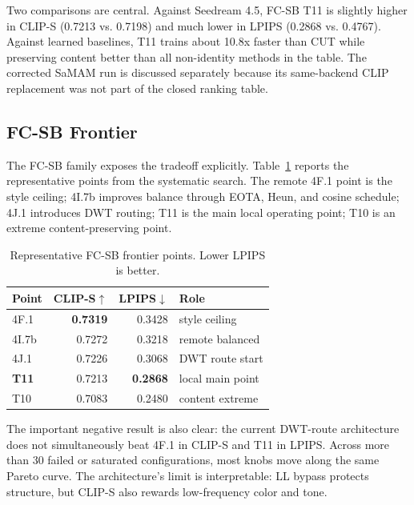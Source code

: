 \documentclass[letterpaper]{article}
\begin{document}
Two comparisons are central. Against Seedream 4.5, FC-SB T11 is slightly higher in CLIP-S (0.7213 vs. 0.7198) and much lower in LPIPS (0.2868 vs. 0.4767). Against learned baselines, T11 trains about 10.8x faster than CUT while preserving content better than all non-identity methods in the table. The corrected SaMAM run is discussed separately because its same-backend CLIP replacement was not part of the closed ranking table.

\subsection{FC-SB Frontier}
The FC-SB family exposes the tradeoff explicitly. Table~\ref{tab:fcsb_frontier} reports the representative points from the systematic search. The remote 4F.1 point is the style ceiling; 4I.7b improves balance through EOTA, Heun, and cosine schedule; 4J.1 introduces DWT routing; T11 is the main local operating point; T10 is an extreme content-preserving point.

\begin{table}[t]
\centering
\small
\setlength{\tabcolsep}{4pt}
\caption{Representative FC-SB frontier points. Lower LPIPS is better.}
\label{tab:fcsb_frontier}
\begin{tabular}{@{}lrrl@{}}
\toprule
Point & CLIP-S$\uparrow$ & LPIPS$\downarrow$ & Role \\
\midrule
4F.1 & \textbf{0.7319} & 0.3428 & style ceiling \\
4I.7b & 0.7272 & 0.3218 & remote balanced \\
4J.1 & 0.7226 & 0.3068 & DWT route start \\
\textbf{T11} & 0.7213 & \textbf{0.2868} & local main point \\
T10 & 0.7083 & 0.2480 & content extreme \\
\bottomrule
\end{tabular}
\end{table}

The important negative result is also clear: the current DWT-route architecture does not simultaneously beat 4F.1 in CLIP-S and T11 in LPIPS. Across more than 30 failed or saturated configurations, most knobs move along the same Pareto curve. The architecture's limit is interpretable: LL bypass protects structure, but CLIP-S also rewards low-frequency color and tone.
\end{document}
